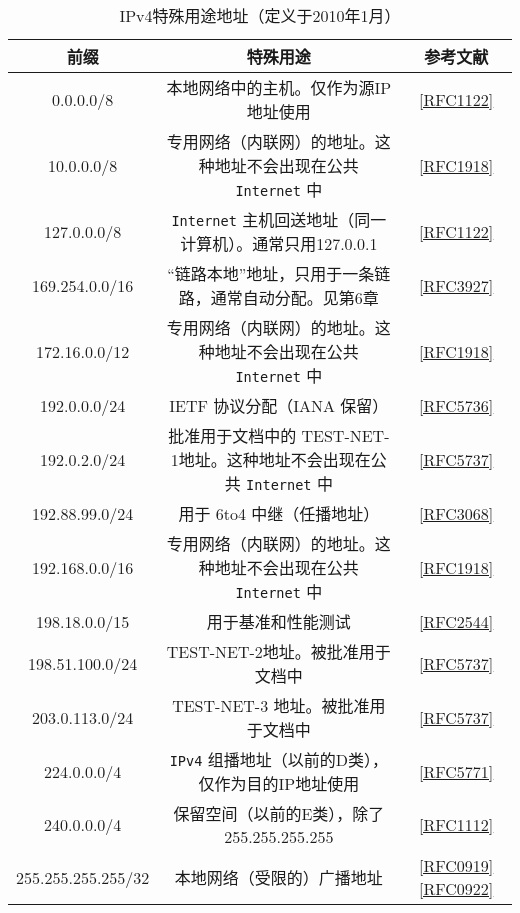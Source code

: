 \begin{table}[H]
    \centering
    \caption{IPv4特殊用途地址（定义于2010年1月）}
    \begin{tabular}{c|c|c}
        \hline
        前缀	             &	特殊用途	                        &	参考文献  \\ \hline
        0.0.0.0/8	        &	本地网络中的主机。仅作为源IP地址使用	&	\href{https://www.rfc-editor.org/rfc/rfc1122}{[RFC1122]}  \\ \hline
        10.0.0.0/8	        &	专用网络（内联网）的地址。这种地址不会出现在公共 \verb|Internet| 中	&	\href{https://www.rfc-editor.org/rfc/rfc1918}{[RFC1918]}  \\ \hline
        127.0.0.0/8	        &	\verb|Internet| 主机回送地址（同一计算机）。通常只用127.0.0.1	&	\href{https://www.rfc-editor.org/rfc/rfc1122}{[RFC1122]}  \\ \hline
        169.254.0.0/16	    &	“链路本地”地址，只用于一条链路，通常自动分配。见第6章	&	\href{https://www.rfc-editor.org/rfc/rfc3927}{[RFC3927]}  \\ \hline
        172.16.0.0/12	    &	专用网络（内联网）的地址。这种地址不会出现在公共 \verb|Internet| 中	&	\href{https://www.rfc-editor.org/rfc/rfc1918}{[RFC1918]}  \\ \hline
        192.0.0.0/24	    &	IETF 协议分配（IANA 保留）	&	\href{https://www.rfc-editor.org/rfc/rfc5736}{[RFC5736]}  \\ \hline
        192.0.2.0/24	    &	批准用于文档中的 TEST-NET-1地址。这种地址不会出现在公共 \verb|Internet| 中	&	\href{https://www.rfc-editor.org/rfc/rfc5737}{[RFC5737]}  \\ \hline
        192.88.99.0/24	    &	用于 6to4 中继（任播地址）	&	\href{https://www.rfc-editor.org/rfc/rfc3068}{[RFC3068]}  \\ \hline
        192.168.0.0/16	    &	专用网络（内联网）的地址。这种地址不会出现在公共 \verb|Internet| 中	&	\href{https://www.rfc-editor.org/rfc/rfc1918}{[RFC1918]}  \\ \hline
        198.18.0.0/15	    &	用于基准和性能测试	&	\href{https://www.rfc-editor.org/rfc/rfc2544}{[RFC2544]}  \\ \hline
        198.51.100.0/24	    &	TEST-NET-2地址。被批准用于文档中	&	\href{https://www.rfc-editor.org/rfc/rfc5737}{[RFC5737]}  \\ \hline
        203.0.113.0/24	    &	TEST-NET-3 地址。被批准用于文档中	&	\href{https://www.rfc-editor.org/rfc/rfc5737}{[RFC5737]}  \\ \hline
        224.0.0.0/4	        &	\verb|IPv4| 组播地址（以前的D类），仅作为目的IP地址使用	&	\href{https://www.rfc-editor.org/rfc/rfc5771}{[RFC5771]}  \\ \hline
        240.0.0.0/4	        &	保留空间（以前的E类），除了255.255.255.255	&	\href{https://www.rfc-editor.org/rfc/rfc1112}{[RFC1112]}  \\ \hline
        255.255.255.255/32	&	本地网络（受限的）广播地址	&	\href{https://www.rfc-editor.org/rfc/rfc0919}{[RFC0919]} \href{https://www.rfc-editor.org/rfc/rfc0922}{[RFC0922]}  \\ \hline
    \end{tabular}
\end{table}

